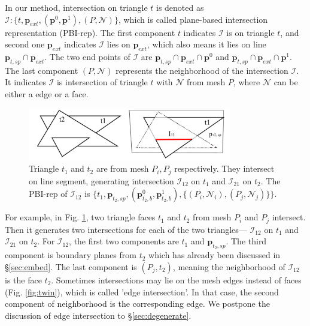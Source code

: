 \documentclass[10pt,journal,compsoc]{IEEEtran}
\begin{document}
In our method, intersection on triangle $t$ is denoted as $\bm{\mathcal{I}}\colon\{t, \bm{p}_{ext}, (\bm{p}^0, \bm{p}^1),(P, \mathcal{N})\}$, which is called plane-based intersection representation (PBI-rep). The first component $t$ indicates $\bm{\mathcal{I}}$ is on triangle $t$, and second one $\bm{p}_{ext}$ indicates $\bm{\mathcal{I}}$ lies on $\bm{p}_{ext}$, which also means it lies on line $\bm{p}_{t, sp} \cap \bm{p}_{ext}$. The two end points of $\bm{\mathcal{I}}$ are $\bm{p}_{t, sp} \cap \bm{p}_{ext}\cap\bm{p}^0$ and $\bm{p}_{t, sp} \cap \bm{p}_{ext}\cap\bm{p}^1$. The last component $(P, \mathcal{N})$ represents the neighborhood of the intersection $\bm{\mathcal{I}}$. It indicates $\bm{\mathcal{I}}$ is intersection of triangle $t$ with $\mathcal{N}$ from mesh $P$, where $\mathcal{N}$ can be either a edge or a face.

\begin{figure}[t]
\centering
\includegraphics[width=3.5in]{pbirep}
\caption{Triangle $t_1$ and $t_2$ are from mesh $P_i, P_j$ respectively. They intersect on line segment, generating intersection $\bm{\mathcal{I}}_{12}$ on $t_1$ and $\bm{\mathcal{I}}_{21}$ on $t_2$. The PBI-rep of $\bm{\mathcal{I}}_{12}$ is $\{t_1, \bm{p}_{t_2, sp}, (\bm{p}_{t_2, b}^0, \bm{p}_{t_2, b}^1),\{(P_i, \mathcal{N}_i), (P_j, \mathcal{N}_j)\}\}$.}
\label{fig:pbi}
\end{figure}

For example, in Fig. \ref{fig:pbi}, two triangle faces $t_1$ and $t_2$ from mesh $P_i$ and $P_j$ intersect. Then it generates two intersections for each of the two triangles--- ${\bm{\mathcal{I}}}_{12}$ on $t_1$ and ${\bm{\mathcal{I}}}_{21}$ on $t_2$. For ${\bm{\mathcal{I}}}_{12}$, the first two components are $t_1$ and $\bm{p}_{t_2, sp}$. The third component is boundary planes from $t_2$ which has already been discussed in \S\ref{sec:embed}. The last component is $(P_j, t_2)$, meaning the neighborhood of ${\bm{\mathcal{I}}}_{12}$ is the face $t_2$. Sometimes intersections may lie on the mesh edges instead of faces (Fig. \ref{fig:twin}), which is called 'edge intersection'. In that case, the second component of neighborhood is the corresponding edge. We postpone the discussion of edge intersection to \S\ref{sec:degenerate}.
\end{document}
